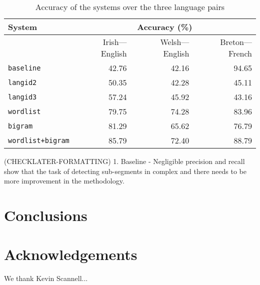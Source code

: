 \documentclass[11pt]{article}
\begin{document}
\begin{table}
\begin{center}
\begin{tabular}{|l|r|r|r|}
\hline
\textbf{System} &  \multicolumn{3}{c|}{\textbf{Accuracy} (\%)} \\
\hline
       &   Irish---English & Welsh---English & Breton---French \\ 
\hline
\texttt{baseline} & 42.76 & 42.16 & 94.65 \\
\hline
\texttt{langid2} & 50.35 & 42.28 & 45.11  \\
\hline
\texttt{langid3} & 57.24 & 45.92 & 43.16 \\
\hline
\texttt{wordlist} & 79.75 & 74.28 & 83.96 \\
\hline
\texttt{bigram} & 81.29 & 65.62 & 76.79 \\
\hline
\texttt{wordlist+bigram} & 85.79 & 72.40 & 88.79 \\
\hline
\end{tabular}
\end{center}
\label{table:accuracy}
\caption{Accuracy of the systems over the three language pairs}
\end{table}


(CHECKLATER-FORMATTING)
1. Baseline - Negligible precision and recall show that the task of detecting sub-segments in complex and there needs to be more improvement in the methodology. 


\section{Conclusions}


\section*{Acknowledgements}

We thank Kevin Scannell... 



\end{document}
